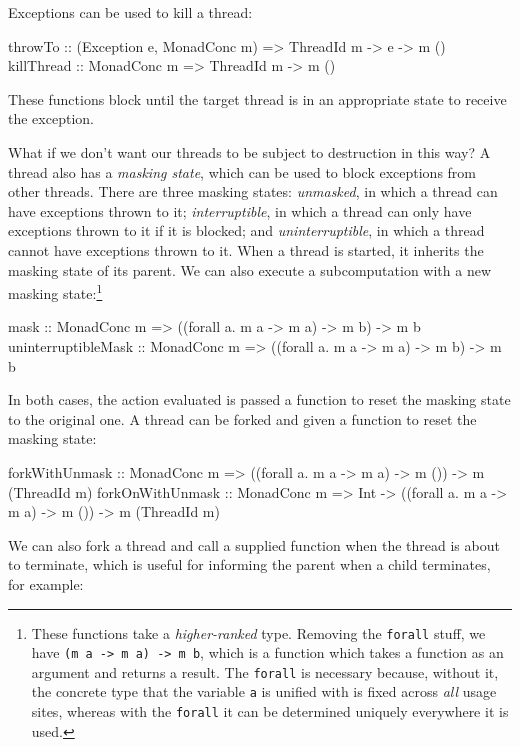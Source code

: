 Exceptions can be used to kill a thread:

\begin{haskellcode}
throwTo :: (Exception e, MonadConc m) => ThreadId m -> e -> m ()
killThread :: MonadConc m => ThreadId m -> m ()
\end{haskellcode}

These functions block until the target thread is in an appropriate
state to receive the exception.

What if we don't want our threads to be subject to destruction in this
way? A thread also has a \emph{masking state}, which can be used to
block exceptions from other threads. There are three masking states:
\emph{unmasked}, in which a thread can have exceptions thrown to it;
\emph{interruptible}, in which a thread can only have exceptions
thrown to it if it is blocked; and \emph{uninterruptible}, in which a
thread cannot have exceptions thrown to it. When a thread is started,
it inherits the masking state of its parent. We can also execute a
subcomputation with a new masking state:\footnote{These functions take
  a \emph{higher-ranked} type. Removing the \texttt{forall} stuff, we
  have \texttt{(m a -> m a) -> m b}, which is a function which takes a
  function as an argument and returns a result. The \texttt{forall} is
  necessary because, without it, the concrete type that the variable
  \texttt{a} is unified with is fixed across \emph{all} usage sites,
  whereas with the \texttt{forall} it can be determined uniquely
  everywhere it is used.}

\begin{haskellcode}
mask :: MonadConc m
  => ((forall a. m a -> m a) -> m b) -> m b
uninterruptibleMask :: MonadConc m
  => ((forall a. m a -> m a) -> m b) -> m b
\end{haskellcode}

In both cases, the action evaluated is passed a function to reset the
masking state to the original one. A thread can be forked and given a
function to reset the masking state:

\begin{haskellcode}
forkWithUnmask :: MonadConc m
  => ((forall a. m a -> m a) -> m ()) -> m (ThreadId m)
forkOnWithUnmask :: MonadConc m => Int
  -> ((forall a. m a -> m a) -> m ()) -> m (ThreadId m)
\end{haskellcode}

We can also fork a thread and call a supplied function when the thread
is about to terminate, which is useful for informing the parent when a
child terminates, for example:

